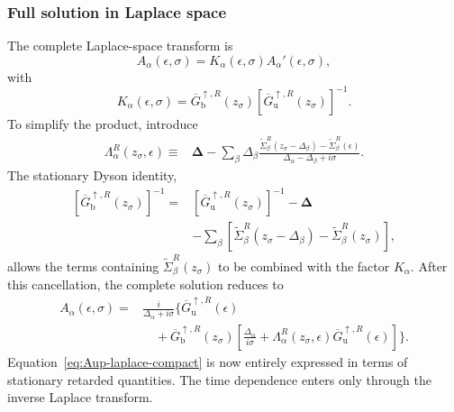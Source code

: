 \documentclass[
 reprint,
 superscriptaddress,
 amsmath,amssymb,
 aps,prb,
 longbibliography,
 floatfix
]{revtex4-2}
\begin{document}
\subsubsection{Full solution in Laplace space}
\label{subsubsec:up-A-full-laplace}

The complete Laplace-space transform is
\begin{equation*}
A_\alpha(\epsilon,\sigma)
=
K_\alpha(\epsilon,\sigma)
A_\alpha'(\epsilon,\sigma),
\end{equation*}
with
\begin{equation*}
K_\alpha(\epsilon,\sigma)
=
\overline G_{\mathrm b}^{\uparrow,R}(z_\sigma)
\left[
\overline G_{\mathrm u}^{\uparrow,R}(z_\sigma)
\right]^{-1}.
\end{equation*}
To simplify the product, introduce
\begin{equation*}
\begin{aligned}
\Lambda_\alpha^R(z_\sigma,\epsilon)
\equiv{}&
\bm\Delta
-
\sum_\beta\Delta_\beta
\frac{
\widetilde\Sigma_\beta^R(z_\sigma-\Delta_\beta)
-\widetilde\Sigma_\beta^R(\epsilon)}
{\Delta_\alpha-\Delta_\beta+i\sigma}.
\end{aligned}
\end{equation*}
The stationary Dyson identity,
\begin{equation}
\begin{aligned}
\left[
\overline G_{\mathrm b}^{\uparrow,R}(z_\sigma)
\right]^{-1}
={}&
\left[
\overline G_{\mathrm u}^{\uparrow,R}(z_\sigma)
\right]^{-1}
-\bm\Delta
\\
&-
\sum_\beta
\left[
\widetilde\Sigma_\beta^R(z_\sigma-\Delta_\beta)
-\widetilde\Sigma_\beta^R(z_\sigma)
\right],
\end{aligned}
\label{eq:up-Dyson-z}
\end{equation}
allows the terms containing $\widetilde\Sigma_\beta^R(z_\sigma)$ to be combined with the factor $K_\alpha$. After this cancellation, the complete solution reduces to
\begin{equation}
\begin{aligned}
A_\alpha(\epsilon,\sigma)
={}&
\frac{i}{\Delta_\alpha+i\sigma}
\Bigg\{
\overline G_{\mathrm u}^{\uparrow,R}(\epsilon)
\\
&\quad+
\overline G_{\mathrm b}^{\uparrow,R}(z_\sigma)
\left[
\frac{\Delta_\alpha}{i\sigma}
+
\Lambda_\alpha^R(z_\sigma,\epsilon)
\overline G_{\mathrm u}^{\uparrow,R}(\epsilon)
\right]
\Bigg\}.
\end{aligned}
\label{eq:Aup-laplace-compact}
\end{equation}
Equation~\eqref{eq:Aup-laplace-compact} is now entirely expressed in terms of stationary retarded quantities. The time dependence enters only through the inverse Laplace transform.
\end{document}
